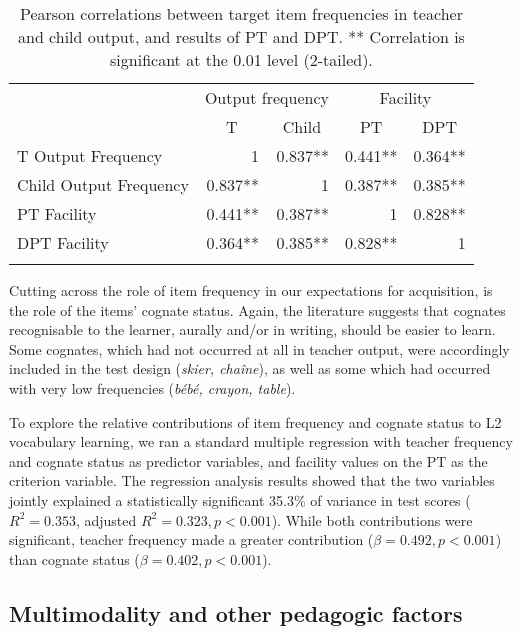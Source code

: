 \documentclass[output=paper]{langscibook}
\begin{document}
\begin{table}
\begin{tabular}{l *4{r}}
\lsptoprule
&\multicolumn{2}{c}{Output frequency} & \multicolumn{2}{c}{Facility}\\\cmidrule(lr){2-3}\cmidrule(lr){4-5}
&	\multicolumn{1}{c}{T} &	\multicolumn{1}{c}{Child} &	\multicolumn{1}{c}{PT} &	\multicolumn{1}{c}{DPT}\\\midrule
{T Output Frequency}        &	1\phantom{.837**}   & 0.837**	& 0.441**   & 0.364**\\
{Child Output Frequency}    &	0.837** & 1\phantom{.837**}     & 0.387**   & 0.385**\\
{PT Facility}               &	0.441** & 0.387**	& 1\phantom{.837**}     & 0.828**\\
{DPT Facility}              &	0.364** & 0.385**   & 0.828**   & 1\phantom{.837**}\\
\lspbottomrule
\end{tabular}
\caption{\label{tab:mitchell:3}Pearson correlations between target item frequencies in teacher and child output, and results of PT and DPT. ** Correlation is significant at the 0.01 level (2-tailed).}
\end{table}

Cutting across the role of item frequency in our expectations for acquisition, is the role of the items' cognate status. Again, the literature suggests that cognates recognisable to the learner, aurally and/or in writing, should be easier to learn. Some cognates, which had not occurred at all in teacher output, were accordingly included in the test design (\textit{skier, chaîne}), as well as some which had occurred with very low frequencies (\textit{bébé, crayon, table}).

To explore the relative contributions of item frequency and cognate status to L2 vocabulary learning, we ran a standard multiple regression with teacher frequency and cognate status as predictor variables, and facility values on the PT as the criterion variable. The regression analysis results showed that the two variables jointly explained a statistically significant 35.3\% of variance in test scores ($R^2 = 0.353$, adjusted $R^2 = 0.323,\allowbreak p < 0.001$). While both contributions were significant, teacher frequency made a greater contribution ($\beta = 0.492,\allowbreak p < 0.001$) than cognate status ($\beta = 0.402,\allowbreak p < 0.001$).

\subsection{Multimodality and other pedagogic factors} %
\end{document}
